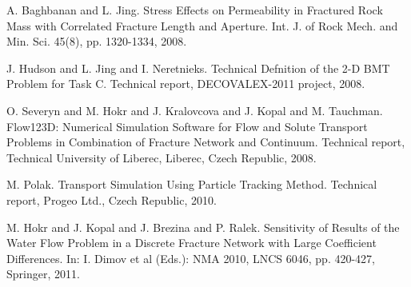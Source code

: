 
\begin{thebibliography}{10}

{\sc A. Baghbanan and L. Jing}. {Stress Effects on Permeability in Fractured Rock Mass with Correlated Fracture Length and Aperture}. Int. J. of Rock Mech. and Min. Sci. 45(8), pp. 1320-1334, 2008.



{\sc J. Hudson and L. Jing and I. Neretnieks}. {Technical Defnition of the 2-D BMT Problem for Task C}. Technical report, DECOVALEX-2011 project, 2008.



{\sc O. Severyn and M. Hokr and J. Kralovcova and J. Kopal and M. Tauchman}. {Flow123D: Numerical Simulation Software for Flow and Solute Transport Problems in Combination of Fracture Network and Continuum}. Technical report, Technical University of Liberec, Liberec, Czech Republic, 2008.



{\sc M. Polak}. {Transport Simulation Using Particle Tracking Method}. Technical report, Progeo Ltd., Czech Republic, 2010.



{\sc M. Hokr and J. Kopal and J. Brezina and P. Ralek}. {Sensitivity of Results of the Water Flow Problem in a Discrete Fracture Network with Large Coefficient Differences}. In: I. Dimov et al (Eds.): NMA 2010, LNCS 6046, pp. 420-427, Springer, 2011.

\end{thebibliography}
